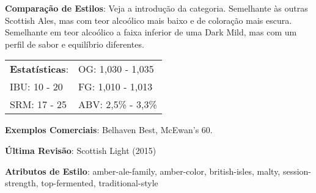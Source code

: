 \textbf{Comparação de Estilos}: Veja a introdução da categoria. Semelhante às outras Scottish Ales, mas com teor alcoólico mais baixo e de coloração mais escura. Semelhante em teor alcoólico a faixa inferior de uma Dark Mild, mas com um perfil de sabor e equilíbrio diferentes.

\begin{tabular}{@{}p{35mm}p{35mm}@{}}
  \textbf{Estatísticas}: & OG: 1,030 - 1,035 \\
  IBU: 10 - 20  & FG: 1,010 - 1,013  \\
  SRM: 17 - 25  & ABV: 2,5\% - 3,3\%
\end{tabular}

\textbf{Exemplos Comerciais}: Belhaven Best, McEwan's 60.

\textbf{Última Revisão}: Scottish Light (2015)

\textbf{Atributos de Estilo}: amber-ale-family, amber-color, british-isles, malty, session-strength, top-fermented, traditional-style
